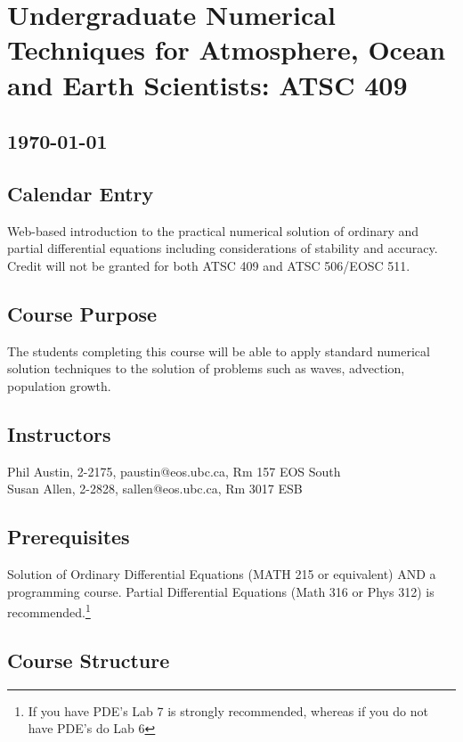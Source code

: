 \documentclass[10pt]{article}
\begin{document}
\section*{Undergraduate Numerical Techniques for Atmosphere, Ocean and Earth Scientists: ATSC 409}
\subsection*{\center\today}

\subsection*{Calendar Entry}

Web-based introduction to the practical numerical solution of ordinary and partial differential equations including considerations of stability and accuracy.  Credit will not be granted for both ATSC 409 and ATSC 506/EOSC 511.

\subsection*{Course Purpose}

The students completing this course will be able to apply standard numerical solution techniques to the solution of problems such as waves, advection, population growth.

\subsection*{Instructors}

       Phil Austin, 2-2175, paustin@eos.ubc.ca, Rm 157 EOS South \\
       Susan Allen, 2-2828, sallen@eos.ubc.ca, Rm 3017 ESB


\subsection*{Prerequisites}

Solution of Ordinary Differential Equations (MATH 215 or equivalent)  AND a programming course.  Partial Differential Equations (Math 316 or Phys 312) is recommended.\footnote{If you have PDE's Lab 7 is strongly recommended, whereas if you do not have PDE's do Lab 6}

\subsection*{Course Structure}
\end{document}

